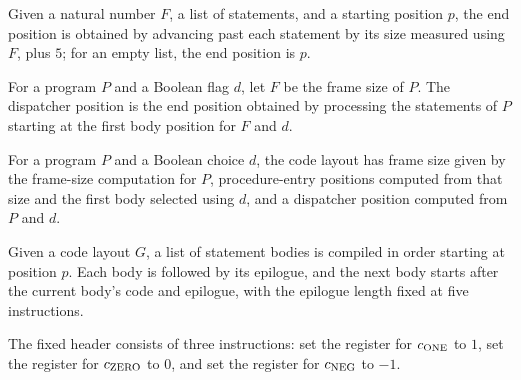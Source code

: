 \begin{definition}
\label{Light.Compiler.endPos}
\leanok
{}
Given a natural number $F$, a list of statements, and a starting position $p$, the end
position is obtained by advancing past each statement by its size measured using $F$,
plus $5$; for an empty list, the end position is $p$.
\end{definition}

\begin{definition}
\label{Light.Compiler.dispPos}
\leanok
{}
For a program $P$ and a Boolean flag $d$, let $F$ be the frame size of $P$. The
dispatcher position is the end position obtained by processing the statements of $P$
starting at the first body position for $F$ and $d$.
\end{definition}

\begin{definition}
\label{Light.Compiler.codeLayout}
\leanok
{}
For a program $P$ and a Boolean choice $d$, the code layout has frame size given by the
frame-size computation for $P$, procedure-entry positions computed from that size and
the first body selected using $d$, and a dispatcher position computed from $P$ and $d$.
\end{definition}

\begin{definition}
\label{Light.Compiler.bodiesCode}
\leanok
{}
Given a code layout $G$, a list of statement bodies is compiled in order starting at
position $p$. Each body is followed by its epilogue, and the next body starts after the
current body's code and epilogue, with the epilogue length fixed at five instructions.
\end{definition}

\begin{definition}
\label{Light.Compiler.headStraight}
\leanok
{}
The fixed header consists of three instructions: set the register for $c_{\rm ONE}$ to
$1$, set the register for $c_{\rm ZERO}$ to $0$, and set the register for $c_{\rm NEG}$ to
$-1$.
\end{definition}

